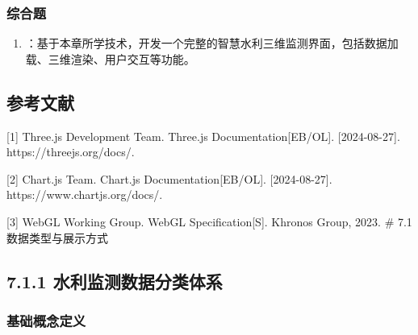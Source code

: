\hypertarget{ux7efcux5408ux9898}{%
\subsubsection{综合题}\label{ux7efcux5408ux9898}}

\begin{enumerate}
\def\labelenumi{\arabic{enumi}.}
\tightlist
\item
  ：基于本章所学技术，开发一个完整的智慧水利三维监测界面，包括数据加载、三维渲染、用户交互等功能。
\end{enumerate}

\hypertarget{ux53c2ux8003ux6587ux732e}{%
\subsection{参考文献}\label{ux53c2ux8003ux6587ux732e}}

{[}1{]} Three.js Development Team. Three.js Documentation{[}EB/OL{]}. {[}2024-08-27{]}. https://threejs.org/docs/.

{[}2{]} Chart.js Team. Chart.js Documentation{[}EB/OL{]}. {[}2024-08-27{]}. https://www.chartjs.org/docs/.

{[}3{]} WebGL Working Group. WebGL Specification{[}S{]}. Khronos Group, 2023. \# 7.1 数据类型与展示方式


\hypertarget{ux6c34ux5229ux76d1ux6d4bux6570ux636eux5206ux7c7bux4f53ux7cfb}{%
\subsection{7.1.1 水利监测数据分类体系}\label{ux6c34ux5229ux76d1ux6d4bux6570ux636eux5206ux7c7bux4f53ux7cfb}}

\hypertarget{ux57faux7840ux6982ux5ff5ux5b9aux4e49}{%
\subsubsection{基础概念定义}\label{ux57faux7840ux6982ux5ff5ux5b9aux4e49}}

